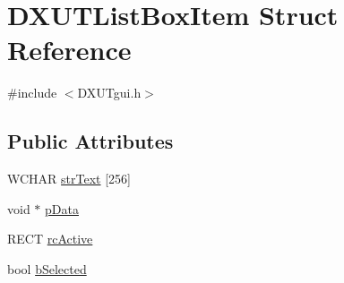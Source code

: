 \hypertarget{struct_d_x_u_t_list_box_item}{
\section{DXUTListBoxItem Struct Reference}
\label{struct_d_x_u_t_list_box_item}
}


{\ttfamily \#include $<$DXUTgui.h$>$}\subsection*{Public Attributes}
\begin{DoxyCompactItemize}
\item 
WCHAR \hyperlink{struct_d_x_u_t_list_box_item_afae48ae64202ceb407e7e61292187003}{strText} \mbox{[}256\mbox{]}
\item 
void $\ast$ \hyperlink{struct_d_x_u_t_list_box_item_ab5321ce735e7a9f9adb77f90cea3c9bc}{pData}
\item 
RECT \hyperlink{struct_d_x_u_t_list_box_item_ab469e8349577c965969b6055c46b5385}{rcActive}
\item 
bool \hyperlink{struct_d_x_u_t_list_box_item_afe3354ef18fa6419ed65eef48005c34e}{bSelected}
\end{DoxyCompactItemize}


